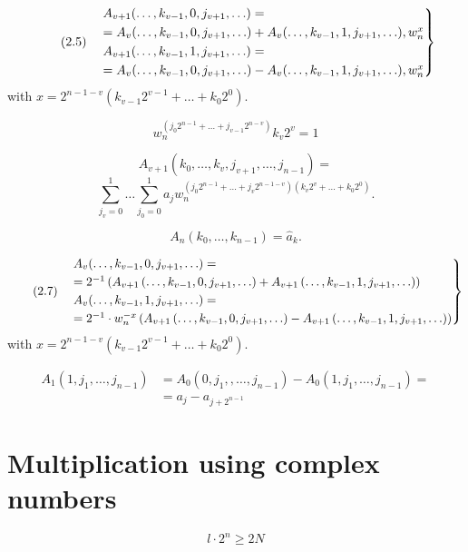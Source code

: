 \documentclass{article}
\begin{document}
\[
\tag{2.5}
\begin{rcases}
& A_{v + 1}(\ldots, k_{v -1}, 0, j_{v + 1}, \ldots) = \\
&= A_v(\ldots, k_{v - 1}, 0, j_{v + 1}, \ldots) + A_v (\ldots, k_{v - 1}, 1, j_{v + 1}, \ldots), w_n^x \\
& A_{v + 1}(\ldots, k_{v -1}, 1, j_{v + 1}, \ldots) = \\
&= A_v(\ldots, k_{v - 1}, 0, j_{v + 1}, \ldots) - A_v (\ldots, k_{v - 1}, 1, j_{v + 1}, \ldots), w_n^x \\
\end{rcases}
\]
with $x = 2^{n - 1 - v} (k_{v - 1} 2^{v - 1} + \ldots + k_0 2^0)$.

\[
w_n^{\left(j_0 2^{n - 1} + \ldots + j_{v - 1} 2^{n - v}\right)} k_v 2^v = 1
\]

\[
A_{v + 1} \left(k_0, \ldots, k_v, j_{v + 1}, \ldots, j_{n - 1}\right) =
\]
\[
\sum_{j_v = 0}^1 \ldots \sum_{j_0 = 0}^1 a_j w_n^{\left(j_0 2^{n - 1} + \ldots + j_v 2^{n - 1 - v}\right)\left(k_v 2^v + \ldots + k_0 2^0\right)}.
\]

\[
\tag{2.6}
A_n (k_0, \ldots, k_{n - 1}) = \hat{a}_k.
\]

\[
\tag{2.7}
\begin{rcases}
&A_v(\ldots, k_{v - 1}, 0, j_{v + 1}, \ldots) = \\
&= 2^{-1} \left(A_{v + 1}\left(\ldots, k_{v - 1}, 0, j_{v + 1}, \ldots\right) + A_{v + 1}\left(\ldots, k_{v - 1}, 1, j_{v + 1}, \ldots\right)\right) \\
&A_v(\ldots, k_{v - 1}, 1, j_{v + 1}, \ldots) = \\
&= 2^{-1} \cdot w_n^{-x} \left(A_{v + 1}\left(\ldots, k_{v - 1}, 0, j_{v + 1}, \ldots\right) - A_{v + 1}\left(\ldots, k_{v - 1}, 1, j_{v + 1}, \ldots\right)\right) \\
\end{rcases}
\] with $x = 2^{n - 1 - v}(k_{v - 1} 2^{v - 1} + \ldots + k_0 2^0)$.

\begin{align*}
\tag{2.8}
A_1(1, j_1, \ldots, j_{n - 1}) &= A_0(0, j_1,, \ldots, j_{n - 1}) - A_0(1, j_1, \ldots, j_{n - 1})  = \\
&= a_j - a_{j + 2^{n - 1}}
\end{align*}

\section{Multiplication using complex numbers}
\[
\tag{3.1}
l \cdot 2^n \ge 2N
\]
\end{document}
